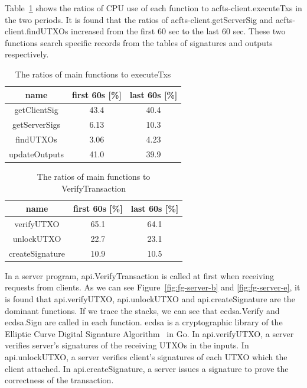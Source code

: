 \documentclass[a4paper, oneside]{discothesis}
\begin{document}
Table~\ref{tbl:bn-client} shows the ratios of CPU use of each function
to acfts-client.executeTxs in the two periods.
It is found that the ratios of acfts-client.getServerSig and acfts-client.findUTXOs increased
from the first 60 sec to the last 60 sec.
These two functions search specific records from the tables of signatures
and outputs respectively.
\begin{table}[t]
    \begin{center}
        \caption{The ratios of main functions to executeTxs}
        \label{tbl:bn-client}
        \begin{tabular}{|c|c|c|} \hline
            name & first 60s [\%] & last 60s [\%] \\ \hline \hline
            getClientSig & 43.4 & 40.4 \\
            getServerSigs & 6.13 & 10.3 \\
            findUTXOs & 3.06 & 4.23 \\ \hline
            updateOutputs & 41.0 & 39.9 \\ \hline
        \end{tabular}
    \end{center}
\end{table}
\begin{table}[t]
    \begin{center}
        \caption{The ratios of main functions to VerifyTransaction}
        \label{tbl:bn-server}
        \begin{tabular}{|c|c|c|} \hline
            name & first 60s [\%] & last 60s [\%] \\ \hline \hline
            verifyUTXO & 65.1 & 64.1 \\
            unlockUTXO & 22.7 & 23.1 \\
            createSignature & 10.9 & 10.5 \\ \hline
        \end{tabular}
    \end{center}
\end{table}

In a server program, api.VerifyTransaction is called at first
when receiving requests from clients.
As we can see Figure~\ref{fig:fg-server-b} and \ref{fig:fg-server-e}, it is found
that api.verifyUTXO, api.unlockUTXO and api.createSignature are the dominant functions.
If we trace the stacks, we can see that ecdsa.Verify and ecdsa.Sign are called in each function.
ecdsa is a cryptographic library of the Elliptic Curve Digital Signature Algorithm~\cite{ecdsa}
in Go.
In api.verifyUTXO, a server verifies server's signatures of the receiving UTXOs in the inputs.
In api.unlockUTXO, a server verifies client's signatures of each UTXO which the client attached.
In api.createSignature, a server issues a signature to prove the correctness of the transaction.
\end{document}
